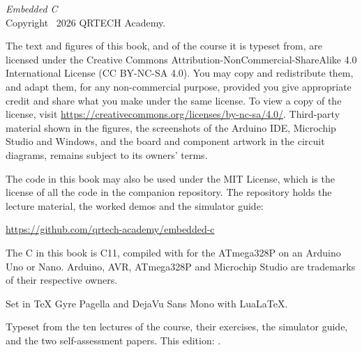 \thispagestyle{empty}
\vspace*{\fill}
{\small
\noindent\textit{Embedded C}\\
Copyright \textcopyright\ 2026 QRTECH Academy.

\medskip
\noindent The text and figures of this book, and of the course it is typeset from, are licensed
under the Creative Commons Attribution-NonCommercial-ShareAlike 4.0 International License
(CC BY-NC-SA 4.0). You may copy and redistribute them, and adapt them, for any non-commercial
purpose, provided you give appropriate credit and share what you make under the same license. To
view a copy of the license, visit \url{https://creativecommons.org/licenses/by-nc-sa/4.0/}.
Third-party material shown in the figures, the screenshots of the Arduino IDE, Microchip Studio and
Windows, and the board and component artwork in the circuit diagrams, remains subject to its
owners' terms.

\medskip
\noindent The code in this book may also be used under the MIT License, which is the license of all
the code in the companion repository. The repository holds the lecture material, the worked demos
and the simulator guide:

\medskip
\noindent\url{https://github.com/qrtech-academy/embedded-c}

\medskip
\noindent The C in this book is C11, compiled with  for the ATmega328P on an Arduino
Uno or Nano. Arduino, AVR, ATmega328P and Microchip Studio are trademarks of their respective
owners.

\medskip
\noindent Set in TeX Gyre Pagella and DejaVu Sans Mono with Lua\LaTeX.

\medskip
\noindent\textcolor{muted}{Typeset from the ten lectures of the course, their exercises, the
simulator guide, and the two self-assessment papers. This edition: \bookedition.}
\par}
\cleardoublepage
